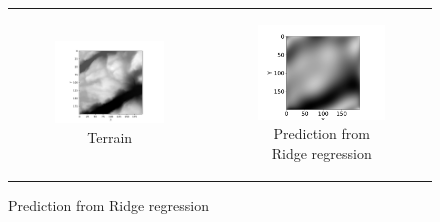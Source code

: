 \begin{figure}[t]
    \centering
    \begin{tabular}{cc}
        \begin{subfigure}[b]{0.49\textwidth}
            \centering
            \includegraphics[width=\textwidth]{examples/tests_even/figs/terrain-map.pdf}
            \caption{Terrain}
            \label{fig:terrain1}
        \end{subfigure} &
        \begin{subfigure}[b]{0.49\textwidth}
            \centering
            \includegraphics[width=\textwidth]{latex/figures/ridge_terrain1_prediction.pdf}
            \caption{Prediction from Ridge regression}
            \label{fig:terrain1-ridge}

\end{subfigure}
\end{tabular}
\end{figure}
